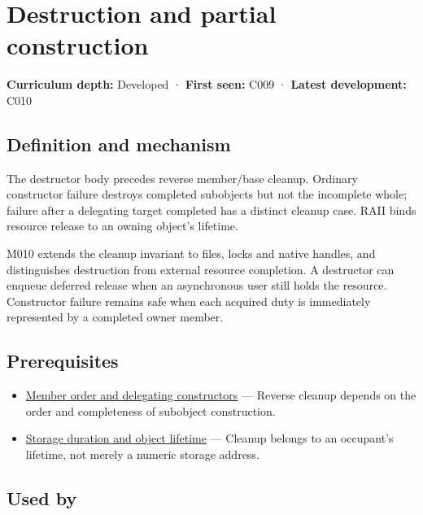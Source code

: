 \hypertarget{appendix-9bfe377cef7a}{}\label{referencestart:appendix-9bfe377cef7a}
\section{Destruction and partial construction}\label{appendix-9bfe377cef7a-destruction-and-partial-construction}

\textbf{Curriculum depth:} Developed · \textbf{First seen:} C009 · \textbf{Latest development:} C010

\subsection{Definition and mechanism}\label{appendix-9bfe377cef7a-definition-and-mechanism}

The destructor body precedes reverse member/base cleanup. Ordinary constructor failure destroys completed subobjects but not the incomplete whole; failure after a delegating target completed has a distinct cleanup case. RAII binds resource release to an owning object's lifetime.

M010 extends the cleanup invariant to files, locks and native handles, and distinguishes destruction from external resource completion. A destructor can enqueue deferred release when an asynchronous user still holds the resource. Constructor failure remains safe when each acquired duty is immediately represented by a completed owner member.

\subsection{Prerequisites}\label{appendix-9bfe377cef7a-prerequisites}

\begin{itemize}
\tightlist
\item
  \hyperref[appendix-3cb49709605a]{Member order and delegating constructors} --- Reverse cleanup depends on the order and completeness of subobject construction.
\item
  \hyperref[appendix-0b104bcba06b]{Storage duration and object lifetime} --- Cleanup belongs to an occupant's lifetime, not merely a numeric storage address.
\end{itemize}

\subsection{Used by}\label{appendix-9bfe377cef7a-used-by}

